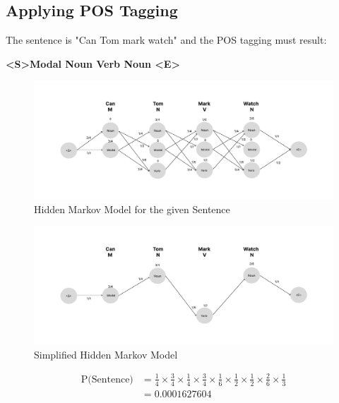 \documentclass{article}
\begin{document}
\pagebreak

\subsection{Applying POS Tagging}
The sentence is "Can Tom mark watch" and the POS tagging must result:

\textbf{\textless S\textgreater Modal Noun Verb Noun \textless E\textgreater}

\begin{figure}[htbp]
    \centering
    \includegraphics[width=1\textwidth]{Images/HMM.pdf}
    \caption{Hidden Markov Model for the given Sentence}
    \label{fig:HMM}
\end{figure}


\begin{figure}[htbp]
    \centering
    \includegraphics[width=1\textwidth]{Images/HMM_Simplified.pdf}
    \caption{Simplified Hidden Markov Model}
    \label{fig:HMM}
\end{figure}

\bigskip
\bigskip
\bigskip


\begin{align*}
\text{P(Sentence)} &= \frac{1}{4} \times \frac{3}{4} \times \frac{1}{4} \times \frac{3}{4} \times \frac{1}{6} \times \frac{1}{2} \times \frac{1}{2} \times \frac{2}{6} \times \frac{1}{3} \\
&= 0.0001627604
\end{align*}
\end{document}
